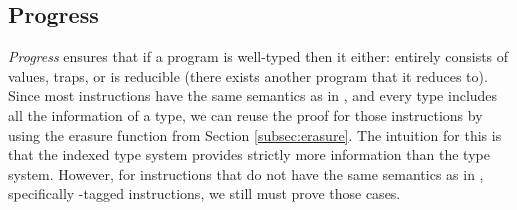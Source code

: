 \subsection{Progress}
\label{subsec:progress}
\emph{Progress} ensures that if a program is well-typed then it either: entirely consists of values, traps, or is reducible (\ie there exists another program that it reduces to).
Since most \name instructions have the same semantics as in \wasm, and every \name type includes all the information of a \wasm type, we can reuse the \wasm proof for those instructions by using the erasure function from Section \ref{subsec:erasure}.
The intuition for this is that the \name indexed type system provides strictly more information than the \wasm type system.
However, for \name instructions that do not have the same semantics as in \wasm, specifically \prechk-tagged instructions, we still must prove those cases.

